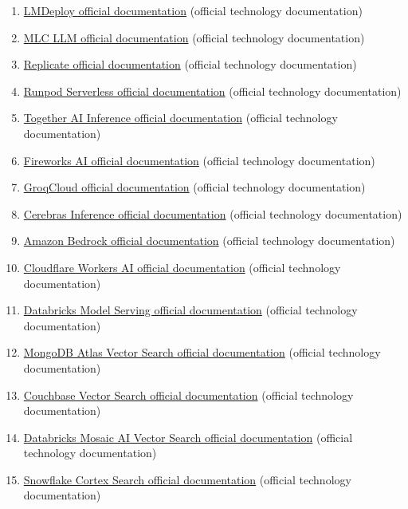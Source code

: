\begin{enumerate}
\item \href{https://lmdeploy.readthedocs.io/en/latest/}{LMDeploy official documentation} (official technology documentation)
\item \href{https://llm.mlc.ai/docs/}{MLC LLM official documentation} (official technology documentation)
\item \href{https://replicate.com/docs}{Replicate official documentation} (official technology documentation)
\item \href{https://docs.runpod.io/serverless/overview}{Runpod Serverless official documentation} (official technology documentation)
\item \href{https://docs.together.ai/docs/inference-overview}{Together AI Inference official documentation} (official technology documentation)
\item \href{https://docs.fireworks.ai/}{Fireworks AI official documentation} (official technology documentation)
\item \href{https://console.groq.com/docs/overview}{GroqCloud official documentation} (official technology documentation)
\item \href{https://inference-docs.cerebras.ai/introduction}{Cerebras Inference official documentation} (official technology documentation)
\item \href{https://docs.aws.amazon.com/bedrock/latest/userguide/what-is-bedrock.html}{Amazon Bedrock official documentation} (official technology documentation)
\item \href{https://developers.cloudflare.com/workers-ai/}{Cloudflare Workers AI official documentation} (official technology documentation)
\item \href{https://docs.databricks.com/aws/en/machine-learning/model-serving/}{Databricks Model Serving official documentation} (official technology documentation)
\item \href{https://www.mongodb.com/docs/atlas/atlas-vector-search/}{MongoDB Atlas Vector Search official documentation} (official technology documentation)
\item \href{https://docs.couchbase.com/server/current/vector-search/vector-search.html}{Couchbase Vector Search official documentation} (official technology documentation)
\item \href{https://docs.databricks.com/aws/en/generative-ai/vector-search/}{Databricks Mosaic AI Vector Search official documentation} (official technology documentation)
\item \href{https://docs.snowflake.com/en/user-guide/snowflake-cortex/cortex-search/cortex-search-overview}{Snowflake Cortex Search official documentation} (official technology documentation)

\end{enumerate}
